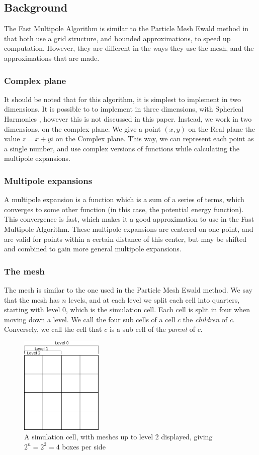 \documentclass[pdftex,twoside,a4paper]{report}
\newcommand{\bcen}{\begin{center}}
\newcommand{\ecen}{\end{center}}
\newcommand{\pmem}{Particle Mesh Ewald method}
\newcommand{\fma}{Fast Multipole Algorithm}
\begin{document}
\subsection{Background}
The \fma{} is similar to the \pmem{} in that both use a grid structure, and bounded approximations, to speed up computation. However, they are different in the ways they use the mesh, and the approximations that are made.
\subsubsection{Complex plane}
It should be noted that for this algorithm, it is simplest to implement in two dimensions. It is possible to to implement in three dimensions, with Spherical Harmonics \cite{Ihler04}, however this is not discussed in this paper. Instead, we work in two dimensions, on the complex plane. We give a point $(x,y)$ on the Real plane the value $z = x + yi$ on the Complex plane. This way, we can represent each point as a single number, and use complex versions of functions while calculating the multipole expansions.

\subsubsection{Multipole expansions}
A multipole expansion is a function which is a sum of a series of terms, which converges to some other function (in this case, the potential energy function). This convergence is fast, which makes it a good approximation to use in the \fma{}. These multipole expansions are centered on one point, and are valid for points within a certain distance of this center, but may be shifted and combined to gain more general multipole expansions. \cite{greengard:315}

\subsubsection{The mesh}
The mesh is similar to the one used in the \pmem{}. We say that the mesh has $n$ levels, and at each level we split each cell into quarters, starting with level $0$, which is the simulation cell. Each cell is split in four when moving down a level. We call the four sub cells of a cell $c$ the \emph{children} of $c$. Conversely, we call the cell that $c$ is a sub cell of the \emph{parent} of $c$.
\begin{figure}[H]
\bcen \includegraphics[width=0.35\textwidth]{figures/fma_mesh.pdf} \ecen
\caption{A simulation cell, with meshes up to level 2 displayed, giving $2^n = 2^2 = 4$ boxes per side}
\end{figure}
\end{document}
